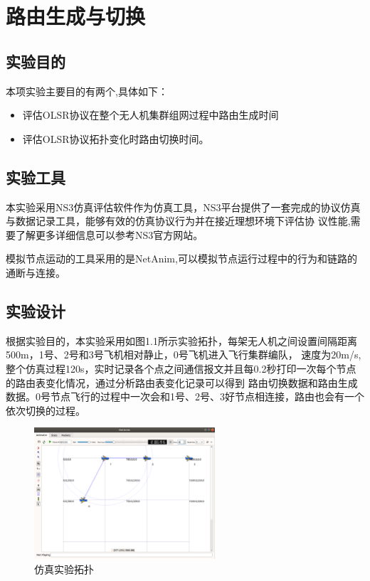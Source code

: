 \documentclass[a4paper,12pt]{report}
\begin{document}
\tableofcontents %

\chapter{路由生成与切换}
\setcounter{page}{1}
\begin{spacing}{1.5}
\songti{}

\section{实验目的}
本项实验主要目的有两个,具体如下：
\begin{itemize}
\itemsep=3pt
\parskip=0pt
\item 评估OLSR协议在整个无人机集群组网过程中路由生成时间
\item 评估OLSR协议拓扑变化时路由切换时间。
\end{itemize}
\section{实验工具}
本实验采用NS3仿真评估软件作为仿真工具，NS3平台提供了一套完成的协议仿真与数据记录工具，能够有效的仿真协议行为并在接近理想环境下评估协
议性能,需要了解更多详细信息可以参考NS3官方网站\cite{NS3.web}。

模拟节点运动的工具采用的是NetAnim,可以模拟节点运行过程中的行为和链路的通断与连接。
\section{实验设计}
根据实验目的，本实验采用如图1.1所示实验拓扑，每架无人机之间设置间隔距离500m，1号、2号和3号飞机相对静止，0号飞机进入飞行集群编队，
速度为20m/s,整个仿真过程120s，实时记录各个点之间通信报文并且每0.2秒打印一次每个节点的路由表变化情况，通过分析路由表变化记录可以得到
路由切换数据和路由生成数据。0号节点飞行的过程中一次会和1号、2号、3好节点相连接，路由也会有一个依次切换的过程。
\begin{figure}[hbtp]
	\centering
	\includegraphics [width=0.6\textwidth]{figure//topo.png}
	\caption{仿真实验拓扑}\label{topo}
\end{figure}


\end{spacing}
\end{document}
